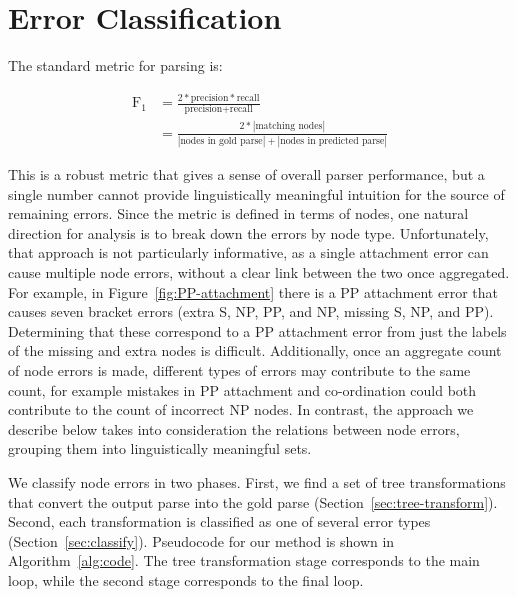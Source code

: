 \section{Error Classification} \label{sec:errors-intro}

The standard metric for parsing is:

\begin{align*}
  \text{F}_1 & = \frac{2 * \text{precision} * \text{recall}}{\text{precision} + \text{recall}} \\
            & = \frac{2 * |\text{matching nodes}|}{|\text{nodes in gold parse}| + |\text{nodes in predicted parse}|}
\end{align*}

This is a robust metric that gives a sense of overall parser performance, but a single number cannot provide linguistically meaningful intuition for the source of remaining errors.
Since the metric is defined in terms of nodes, one natural direction for analysis is to break down the errors by node type.
Unfortunately, that approach is not particularly informative, as a single attachment error can cause multiple node errors, without a clear link between the two once aggregated.
For example, in Figure~\ref{fig:PP-attachment} there is a PP attachment error that causes seven bracket errors (extra S, NP, PP, and NP, missing S, NP, and PP).
Determining that these correspond to a PP attachment error from just the labels of the missing and extra nodes is difficult.
Additionally, once an aggregate count of node errors is made, different types of errors may contribute to the same count, for example mistakes in PP attachment and co-ordination could both contribute to the count of incorrect NP nodes.
In contrast, the approach we describe below takes into consideration the relations between node errors, grouping them into linguistically meaningful sets.

We classify node errors in two phases.
First, we find a set of tree transformations that convert the output parse into the gold parse (Section~\ref{sec:tree-transform}).
Second, each transformation is classified as one of several error types (Section~\ref{sec:classify}).
Pseudocode for our method is shown in Algorithm~\ref{alg:code}.
The tree transformation stage corresponds to the main loop, while the second stage corresponds to the final loop.

